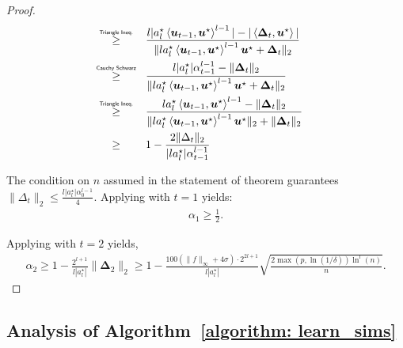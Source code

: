 \documentclass[final,12pt]{colt2018} %
\newcommand{\explain}[2]{\mathrel{\overset{\makebox[0pt]{\mbox{\normalfont\tiny\sffamily #1}}}{#2}}}
\renewcommand\v[1]{{\ensuremath{\boldsymbol{#1}}}}
\newcommand\ip[1]{\left\langle #1 \right\rangle}
\begin{document}
\begin{proof}
\begin{align}
    & \explain{Triangle Ineq.}{\geq}\qquad \frac{l|a_l^\star \ip{\v u_{t-1}, \v u^\star}^{l-1}| - |\ip{\v \Delta_t, \v u^\star}|}{\|l a_l^\star \ip{\v u_{t-1}, \v u^\star}^{l-1} \v u^\star + \v \Delta_t \|_2} \nonumber \\
    & \explain{Cauchy Schwarz}{\geq} \qquad \frac{l|a_l^\star| \alpha_{t-1}^{l-1} - \|\v \Delta_t\|_2}{\| l a_l^\star \ip{\v u_{t-1}, \v u^\star}^{l-1} \v u^\star + \v \Delta_t \|_2} \nonumber \\
    & \explain{Triangle Ineq.}{\geq}\qquad \frac{la_l^\star \ip{\v u_{t-1}, \v u^\star}^{l-1} - \|\v \Delta_t\|_2}{\| l a_l^\star \ip{\v u_{t-1}, \v u^\star}^{l-1} \v u^\star \|_2 + \| \v \Delta_t \|_2} \nonumber \\
    & \geq \qquad 1 - \frac{2 \|\Delta_t\|_2}{|l a_l^\star| \alpha_{t-1}^{l-1}} \label{equation: algo_1_analysis_eq2}
\end{align}


The condition on $n$ assumed in the statement of theorem guarantees $\|\Delta_t\|_2 \leq \frac{l|a_l^\star| \alpha_0^{l-1}}{4}$. Applying  with $t=1$ yields:
\begin{align*}
    \alpha_1 \geq \frac{1}{2}.
\end{align*}

Applying  with $t=2$ yields,
\begin{align*}
    \alpha_2 \geq 1 - \frac{2^{l+1}}{l|a_l^\star|} \|\v \Delta_2\|_2 \geq 1 - \frac{100 (\|f\|_\infty + 4\sigma) \cdot 2^{2l+1}}{l|a_l^\star|} \sqrt{\frac{2\max(p,\ln(1/\delta))\ln^l(n)}{n}}.
\end{align*}
\end{proof}

\subsection{Analysis of Algorithm~\ref{algorithm: learn_sims}}
\end{document}
